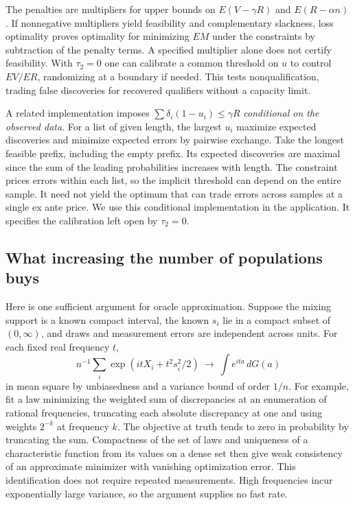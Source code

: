 \documentclass[11pt]{article}
\begin{document}
The penalties are multipliers for upper bounds on $E(V-\gamma R)$ and $E(R-\alpha n)$. If nonnegative multipliers yield feasibility and complementary slackness, loss optimality proves optimality for minimizing $EM$ under the constraints by subtraction of the penalty terms. A specified multiplier alone does not certify feasibility. With $\tau_2=0$ one can calibrate a common threshold on $u$ to control $EV/ER$, randomizing at a boundary if needed. This tests nonqualification, trading false discoveries for recovered qualifiers without a capacity limit.

A related implementation imposes $\sum\delta_i(1-u_i)\le\gamma R$ \emph{conditional on the observed data}. For a list of given length, the largest $u_i$ maximize expected discoveries and minimize expected errors by pairwise exchange. Take the longest feasible prefix, including the empty prefix. Its expected discoveries are maximal since the sum of the leading probabilities increases with length. The constraint prices errors within each list, so the implicit threshold can depend on the entire sample. It need not yield the optimum that can trade errors across samples at a single ex ante price. We use this conditional implementation in the application. It specifies the calibration left open by $\tau_2=0$.

\subsection{What increasing the number of populations buys}
Here is one sufficient argument for oracle approximation. Suppose the mixing support is a known compact interval, the known $s_i$ lie in a compact subset of $(0,\infty)$, and draws and measurement errors are independent across units. For each fixed real frequency $t$,
\[
 n^{-1}\sum_i \exp(itX_i+t^2s_i^2/2)
 \ \longrightarrow\ \int e^{ita}\,dG(a)
\]
in mean square by unbiasedness and a variance bound of order $1/n$. For example, fit a law minimizing the weighted sum of discrepancies at an enumeration of rational frequencies, truncating each absolute discrepancy at one and using weights $2^{-k}$ at frequency $k$. The objective at truth tends to zero in probability by truncating the sum. Compactness of the set of laws and uniqueness of a characteristic function from its values on a dense set then give weak consistency of an approximate minimizer with vanishing optimization error. This identification does not require repeated measurements. High frequencies incur exponentially large variance, so the argument supplies no fast rate.
\end{document}

